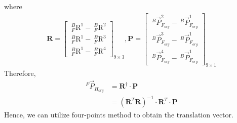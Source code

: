where
\begin{equation*}
\begin{split}
\textbf{R} =  
\begin{bmatrix}
\  _{F}^{B}\textrm{R}^{1} - \  _{F}^{B}\textrm{R}^{2}\\ 
\  _{F}^{B}\textrm{R}^{1} - \  _{F}^{B}\textrm{R}^{3}\\ 
\  _{F}^{B}\textrm{R}^{1} - \  _{F}^{B}\textrm{R}^{4}
\end{bmatrix}_{9 \times 3}, 
\textbf{P} = 
\begin{bmatrix}
\ ^{B}\vec{P}_{F_{org}}^{2} -\ ^{B}\vec{P}_{F_{org}}^{1} \\ 
\ ^{B}\vec{P}_{F_{org}}^{3} -\ ^{B}\vec{P}_{F_{org}}^{1} \\ 
\ ^{B}\vec{P}_{F_{org}}^{4} -\ ^{B}\vec{P}_{F_{org}}^{1} 
\end{bmatrix}_{9 \times 1}
\end{split}
\end{equation*}
Therefore,
\begin{equation*}
\begin{split}
^{F}\vec{P}_{H_{org}} &= \textbf{R}^{\dagger} \cdot \textbf{P}\\
					  &= \left( \textbf{R}^T\textbf{R}\right) ^{-1}\cdot \textbf{R}^T\cdot \textbf{P}
\end{split}
\end{equation*}
Hence, we can utilize four-points method to obtain the translation vector.
